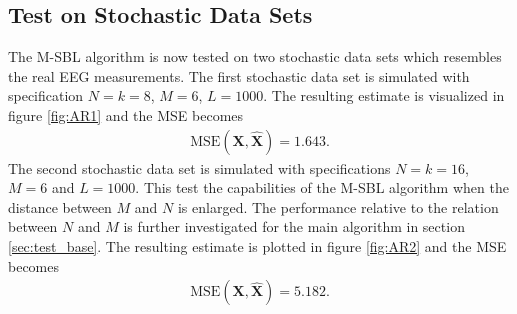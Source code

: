 \subsection{Test on Stochastic Data Sets}\label{sec:testMsbl_stoch}
The M-SBL algorithm is now tested on two stochastic data sets which resembles the real EEG measurements. 
The first stochastic data set is simulated with specification $N = k = 8$, $M = 6$, $L=1000$. 
The resulting estimate is visualized in figure \ref{fig:AR1} and the MSE becomes 
\begin{align*}
\text{MSE}(\mathbf{X}, \hat{\mathbf{X}}) = 1.643.
\end{align*} 
The second stochastic data set is simulated with specifications $N = k =16$, $M = 6$ and $L=1000$. 
This test the capabilities of the M-SBL algorithm when the distance between $M$ and $N$ is enlarged. 
The performance relative to the relation between $N$ and $M$ is further investigated for the main algorithm in section \ref{sec:test_base}.
The resulting estimate is plotted in figure \ref{fig:AR2} and the MSE becomes 
\begin{align*}
\text{MSE}(\mathbf{X}, \hat{\mathbf{X}}) = 5.182. 
\end{align*}  
